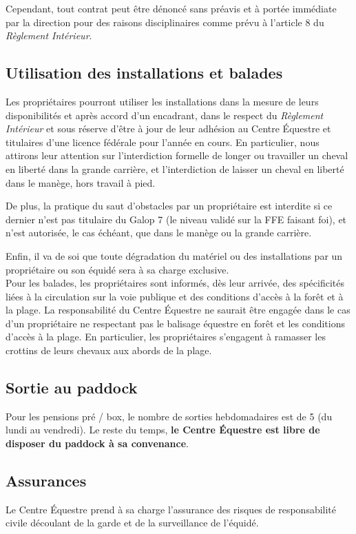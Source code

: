 \documentclass[11pt,a4paper]{article}
\begin{document}
Cependant, tout contrat peut être dénoncé sans préavis et à portée immédiate par la direction pour des raisons disciplinaires comme prévu à l'article 8 du \textit{Règlement Intérieur}.

\subsection*{Utilisation des installations et balades}
Les propriétaires pourront utiliser les installations dans la mesure de leurs disponibilités et après accord d'un encadrant, dans le respect du \textit{Règlement Intérieur} et sous réserve d'être à jour de leur adhésion au Centre Équestre et titulaires d'une licence fédérale pour l'année en cours.
En particulier, nous attirons leur attention sur l'interdiction formelle de longer ou travailler un cheval en liberté dans la grande carrière, et l'interdiction de laisser un cheval en liberté dans le manège, hors travail à pied.

De plus, la pratique du saut d'obstacles par un propriétaire est interdite si ce dernier n'est pas titulaire du Galop 7 (le niveau validé sur la FFE faisant foi), et n'est autorisée, le cas échéant, que dans le manège ou la grande carrière.

Enfin, il va de soi que toute dégradation du matériel ou des installations par un propriétaire ou son équidé sera à sa charge exclusive.
\\

Pour les balades, les propriétaires sont informés, dès leur arrivée, des spécificités liées à la circulation sur la voie publique et des conditions d'accès à la forêt et à la plage.
La responsabilité du Centre Équestre ne saurait être engagée dans le cas d'un propriétaire ne respectant pas le balisage équestre en forêt et les conditions d'accès à la plage. En particulier, les propriétaires s'engagent à ramasser les crottins de leurs chevaux aux abords de la plage.

\subsection*{Sortie au paddock}
Pour les pensions pré / box, le nombre de sorties hebdomadaires est de 5 (du lundi au vendredi).
Le reste du temps, \textbf{le Centre Équestre est libre de disposer du paddock à sa convenance}.

\subsection*{Assurances}
Le Centre Équestre prend à sa charge l'assurance des risques de responsabilité civile découlant de la garde et de la surveillance de l'équidé.
\end{document}
